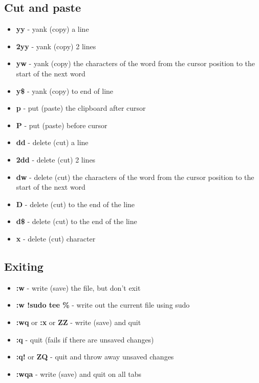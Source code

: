 \documentclass[twocolumn]{article}
\providecommand{\tightlist}{%
  \setlength{\itemsep}{0pt}\setlength{\parskip}{0pt}}
\begin{document}
\hypertarget{cut-and-paste}{%
\subsection{Cut and paste}\label{cut-and-paste}}

\begin{itemize}
\tightlist
\item
  \textbf{yy} - yank (copy) a line
\item
  \textbf{2yy} - yank (copy) 2 lines
\item
  \textbf{yw} - yank (copy) the characters of the word from the cursor
  position to the start of the next word
\item
  \textbf{y\$} - yank (copy) to end of line
\item
  \textbf{p} - put (paste) the clipboard after cursor
\item
  \textbf{P} - put (paste) before cursor
\item
  \textbf{dd} - delete (cut) a line
\item
  \textbf{2dd} - delete (cut) 2 lines
\item
  \textbf{dw} - delete (cut) the characters of the word from the cursor
  position to the start of the next word
\item
  \textbf{D} - delete (cut) to the end of the line
\item
  \textbf{d\$} - delete (cut) to the end of the line
\item
  \textbf{x} - delete (cut) character
\end{itemize}

\hypertarget{exiting}{%
\subsection{Exiting}\label{exiting}}

\begin{itemize}
\tightlist
\item
  \textbf{:w} - write (save) the file, but don't exit
\item
  \textbf{:w !sudo tee \%} - write out the current file using sudo
\item
  \textbf{:wq} or \textbf{:x} or \textbf{ZZ} - write (save) and quit
\item
  \textbf{:q} - quit (fails if there are unsaved changes)
\item
  \textbf{:q!} or \textbf{ZQ} - quit and throw away unsaved changes
\item
  \textbf{:wqa} - write (save) and quit on all tabs
\end{itemize}
\end{document}
